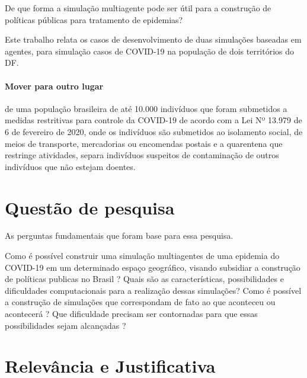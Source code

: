 De que forma a simulação multiagente pode ser útil para a construção de políticas públicas para tratamento de epidemias?


Este trabalho relata os casos de desenvolvimento de duas simulações baseadas em agentes, para simulação casos de COVID-19 na população de dois territórios do DF.


\paragraph{Mover para outro lugar}
de uma população brasileira de até 10.000 indivíduos que foram submetidos a medidas restritivas para controle da COVID-19 de acordo com a Lei Nº 13.979 de 6 de fevereiro de 2020, onde os indivíduos são submetidos ao isolamento social, de meios de transporte, mercadorias ou encomendas postais e a quarentena que restringe atividades, separa indivíduos suspeitos de contaminação de outros indivíduos que não estejam doentes.


\section{Questão de pesquisa}%
As perguntas fundamentais que foram base para essa pesquisa.

Como é possível construir uma simulação multiagentes de uma epidemia do COVID-19 em um determinado espaço geográfico, visando subsidiar a construção de políticas publicas no Brasil ?  Quais são as características, possibilidades e dificuldades computacionais para a realização dessas simulações? Como é  possível a construção de simulações que correspondam de fato ao que aconteceu ou acontecerá ? Que dificuldade precisam ser contornadas para que essas possibilidades sejam alcançadas ?


\section{Relevância e Justificativa}%

